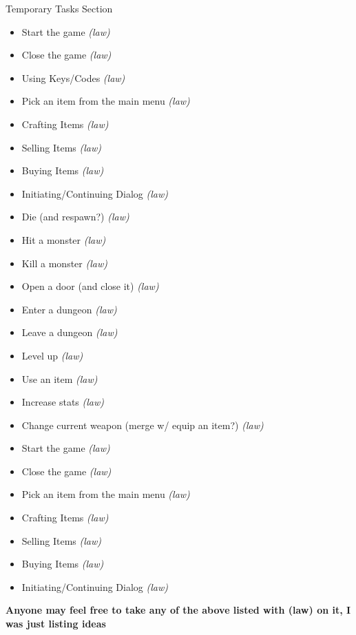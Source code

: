 \documentclass[12pt]{report}
\begin{document}
\begin{section}{Temporary Tasks Section}
\begin{itemize}
\item	Start the game \textit{(law)} %
\item	Close the game \textit{(law)}
\item	Using Keys/Codes \textit{(law)} %
\item	Pick an item from the main menu \textit{(law)}
\item	Crafting Items \textit{(law)} %
\item	Selling Items \textit{(law)} %
\item	Buying Items \textit{(law)} %
\item	Initiating/Continuing Dialog \textit{(law)} %
\item	Die (and respawn?) \textit{(law)}
\item	Hit a monster \textit{(law)} %
\item	Kill a monster \textit{(law)} %
\item	Open a door (and close it) \textit{(law)} %
\item	Enter a dungeon \textit{(law)} %
\item	Leave a dungeon \textit{(law)} %
\item	Level up \textit{(law)}
\item	Use an item \textit{(law)}
\item	Increase stats \textit{(law)}
\item	Change current weapon (merge w/ equip an item?) \textit{(law)}
\item	Start the game \textit{(law)} %
\item	Close the game \textit{(law)}
\item	Pick an item from the main menu \textit{(law)}
\item	Crafting Items \textit{(law)} %
\item	Selling Items \textit{(law)} %
\item	Buying Items \textit{(law)} %
\item	Initiating/Continuing Dialog \textit{(law)} %
\end{itemize}

\large \textbf{Anyone may feel free to take any of the above listed with (law) on it, 
I was just listing ideas}

\end{section}
\end{document}
